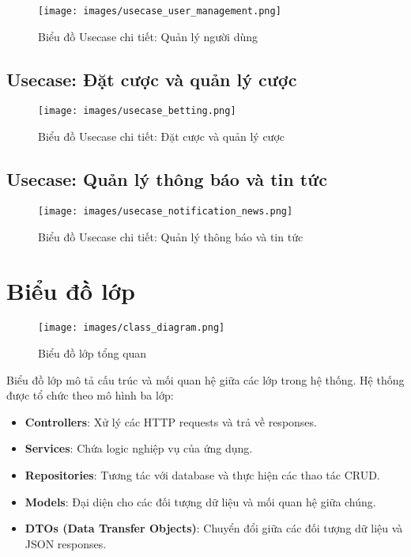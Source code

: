 \documentclass[a4paper,12pt]{report}
\begin{document}
\begin{figure}[H]
\centering
\texttt{[image: images/usecase\_user\_management.png]}
\caption{Biểu đồ Usecase chi tiết: Quản lý người dùng}
\label{fig:usecase-user-management}
\end{figure}

\subsection{Usecase: Đặt cược và quản lý cược}

\begin{figure}[H]
\centering
\texttt{[image: images/usecase\_betting.png]}
\caption{Biểu đồ Usecase chi tiết: Đặt cược và quản lý cược}
\label{fig:usecase-betting}
\end{figure}

\subsection{Usecase: Quản lý thông báo và tin tức}

\begin{figure}[H]
\centering
\texttt{[image: images/usecase\_notification\_news.png]}
\caption{Biểu đồ Usecase chi tiết: Quản lý thông báo và tin tức}
\label{fig:usecase-notification-news}
\end{figure}

\section{Biểu đồ lớp}

\begin{figure}[H]
\centering
\texttt{[image: images/class\_diagram.png]}
\caption{Biểu đồ lớp tổng quan}
\label{fig:class-diagram}
\end{figure}

Biểu đồ lớp mô tả cấu trúc và mối quan hệ giữa các lớp trong hệ thống. Hệ thống được tổ chức theo mô hình ba lớp:

\begin{itemize}
    \item \textbf{Controllers}: Xử lý các HTTP requests và trả về responses.
    \item \textbf{Services}: Chứa logic nghiệp vụ của ứng dụng.
    \item \textbf{Repositories}: Tương tác với database và thực hiện các thao tác CRUD.
    \item \textbf{Models}: Đại diện cho các đối tượng dữ liệu và mối quan hệ giữa chúng.
    \item \textbf{DTOs (Data Transfer Objects)}: Chuyển đổi giữa các đối tượng dữ liệu và JSON responses.
\end{itemize}
\end{document}
